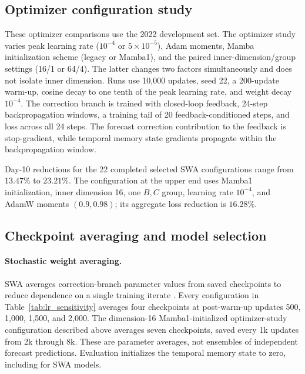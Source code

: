 \documentclass[11pt]{article}
\begin{document}
\FloatBarrier
\subsection{\texorpdfstring{{Optimizer configuration study}}{Optimizer configuration study}}
\label{app:optimizer_study}
{These optimizer comparisons use the 2022 development set.}
The optimizer study varies peak learning rate ($10^{-4}$ or $5\times10^{-5}$), Adam moments, Mamba initialization scheme (legacy or Mamba1), and the paired inner-dimension/group settings (16/1 or 64/4). The latter changes two factors simultaneously and does not isolate inner dimension. Runs use 10,000 updates, seed 22, a 200-update warm-up, cosine decay to one tenth of the peak learning rate, and weight decay $10^{-4}$. {The correction branch is trained} with closed-loop feedback, 24-step backpropagation windows, a training tail of 20 feedback-conditioned steps, and loss across all 24 steps. {The forecast correction contribution to the feedback} is stop-gradient, while temporal memory state gradients propagate within the backpropagation window.

Day-10 reductions for the 22 completed selected SWA configurations range from $13.47\%$ to $23.21\%$. The configuration at the upper end uses Mamba1 initialization, inner dimension 16, one $B,C$ group, learning rate $10^{-4}$, and AdamW moments $(0.9,0.98)$; its aggregate loss reduction is $16.28\%$.

\subsection{\texorpdfstring{{Checkpoint averaging and model selection}}{Checkpoint averaging and model selection}}
\label{app:checkpoint_selection}
\begin{samepage}
\paragraph{Stochastic weight averaging.}
{SWA averages correction-branch parameter values} from saved checkpoints to reduce dependence on a single training iterate \citep{izmailov2019averagingweightsleadswider}. Every configuration in {Table~\ref{tab:lr_sensitivity}} averages four checkpoints at {post-warm-up updates} 500, 1,000, 1,500, and 2,000. The dimension-16 Mamba1-initialized optimizer-study configuration described above averages seven checkpoints, saved every 1k updates from 2k through 8k. These are parameter averages, not ensembles of independent forecast predictions. {Evaluation initializes the temporal memory state to zero}, including for SWA models.
\end{samepage}
\end{document}
